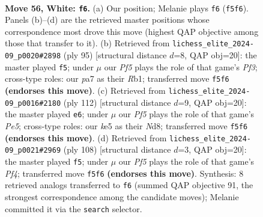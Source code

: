 \documentclass[11pt]{article}
\begin{document}
\clearpage

\begin{figure}[p]\centering
\begin{subfigure}{0.46\textwidth}\centering
\resizebox{\linewidth}{!}{%
\newchessgame
\chessboard[
  setfen={8/p2p4/2p5/4kP2/2r5/6K1/8/8 w - - 13 56},
  showmover=false,
  pgfstyle=straightmove, color=movearrow, markmove={f5-f6}
]}
\caption{}
\end{subfigure}\hfill
\begin{subfigure}{0.46\textwidth}\centering
\resizebox{\linewidth}{!}{%
\newchessgame
\chessboard[
  setfen={4k3/8/5pK1/8/5P1R/8/8/1r6 b - - 7 48},
  showmover=false,
  pgfstyle=straightmove, color=movearrow, markmove={f6-f5}
]}
\caption{}
\end{subfigure}
\\[4pt]
\begin{subfigure}{0.46\textwidth}\centering
\resizebox{\linewidth}{!}{%
\newchessgame
\chessboard[
  setfen={3N4/8/1pp5/3kP3/1r6/4K3/8/8 w - - 3 57},
  showmover=false,
  pgfstyle=straightmove, color=movearrow, markmove={e5-e6}
]}
\caption{}
\end{subfigure}\hfill
\begin{subfigure}{0.46\textwidth}\centering
\resizebox{\linewidth}{!}{%
\newchessgame
\chessboard[
  setfen={8/pp5r/2p5/8/5Pk1/8/P5K1/8 w - - 0 55},
  showmover=false,
  pgfstyle=straightmove, color=movearrow, markmove={f4-f5}
]}
\caption{}
\end{subfigure}
\caption{\textbf{Move 56, White: \texttt{f6}.} (a) Our position; Melanie plays \texttt{f6} (\texttt{f5f6}). Panels (b)--(d) are the retrieved master positions whose correspondence most drove this move (highest QAP objective among those that transfer to it). (b) Retrieved from \texttt{lichess\_elite\_2024-09\_p0020\#2898} (ply 95) [structural distance $d$=8, QAP obj=20]: the master played \texttt{f5}; under $\mu$ our \emph{Pf5} plays the role of that game's \emph{Pf3}; cross-type roles: our \emph{p}a7 as their \emph{R}b1; transferred move \texttt{f5f6} \textbf{(endorses this move)}. (c) Retrieved from \texttt{lichess\_elite\_2024-09\_p0016\#2180} (ply 112) [structural distance $d$=9, QAP obj=20]: the master played \texttt{e6}; under $\mu$ our \emph{Pf5} plays the role of that game's \emph{Pe5}; cross-type roles: our \emph{k}e5 as their \emph{N}d8; transferred move \texttt{f5f6} \textbf{(endorses this move)}. (d) Retrieved from \texttt{lichess\_elite\_2024-09\_p0021\#2969} (ply 108) [structural distance $d$=3, QAP obj=20]: the master played \texttt{f5}; under $\mu$ our \emph{Pf5} plays the role of that game's \emph{Pf4}; transferred move \texttt{f5f6} \textbf{(endorses this move)}. Synthesis: 8 retrieved analogs transferred to \texttt{f6} (summed QAP objective 91, the strongest correspondence among the candidate moves); Melanie committed it via the \texttt{search} selector.}
\label{fig:thought-m110}
\end{figure}
\end{document}
